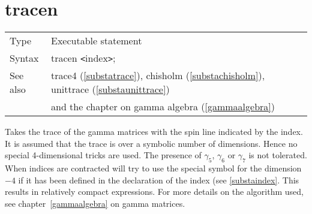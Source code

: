

 \vspace{10mm}


\section{tracen}
\label{substatracen}

\noindent \begin{tabular}{ll}
Type & Executable statement\\
Syntax & tracen {\tt<}index{\tt>}; \\
See also & trace4 (\ref{substatrace}), chisholm (\ref{substachisholm}),
    unittrace (\ref{substaunittrace}) \\ &
    and the chapter on gamma algebra (\ref{gammaalgebra})
\end{tabular} \vspace{4mm}

\noindent Takes the trace of the gamma 
matrices with the spin line indicated by the index. It is 
assumed that the trace is over a symbolic number of dimensions. Hence no 
special 4-dimensional tricks are used. The presence of $\gamma_5$, 
$\gamma_6$ or $\gamma_7$ is not tolerated. When indices are contracted 
{\FORM} will try to use the special symbol for the dimension$-4$ if it has 
been defined in the declaration of the index (see \ref{substaindex}. This 
results in relatively compact expressions. For more details on the 
algorithm used, see chapter~\ref{gammaalgebra} on gamma matrices. 
\vspace{10mm}

